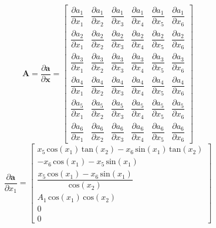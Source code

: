 \begin{equation}
	\boldsymbol A = \dfrac{\partial \boldsymbol a}{\partial  \boldsymbol x} =
	\begin{bmatrix}
\dfrac{\partial  a_1}{\partial  x_1}&
\dfrac{\partial  a_1}{\partial  x_2}&
\dfrac{\partial  a_1}{\partial  x_3}&
\dfrac{\partial  a_1}{\partial  x_4}&
\dfrac{\partial  a_1}{\partial  x_5}&
\dfrac{\partial  a_1}{\partial  x_6}
\\[1em]
\dfrac{\partial  a_2}{\partial  x_1}&
\dfrac{\partial  a_2}{\partial  x_2}&
\dfrac{\partial  a_2}{\partial  x_3}&
\dfrac{\partial  a_2}{\partial  x_4}&
\dfrac{\partial  a_2}{\partial  x_5}&
\dfrac{\partial  a_2}{\partial  x_6}
\\[1em]
\dfrac{\partial  a_3}{\partial  x_1}&
\dfrac{\partial  a_3}{\partial  x_2}&
\dfrac{\partial  a_3}{\partial  x_3}&
\dfrac{\partial  a_3}{\partial  x_4}&
\dfrac{\partial  a_3}{\partial  x_5}&
\dfrac{\partial  a_3}{\partial  x_6}
\\[1em]
\dfrac{\partial  a_4}{\partial  x_1}&
\dfrac{\partial  a_4}{\partial  x_2}&
\dfrac{\partial  a_4}{\partial  x_3}&
\dfrac{\partial  a_4}{\partial  x_4}&
\dfrac{\partial  a_4}{\partial  x_5}&
\dfrac{\partial  a_4}{\partial  x_6}
\\[1em]
\dfrac{\partial  a_5}{\partial  x_1}&
\dfrac{\partial  a_5}{\partial  x_2}&
\dfrac{\partial  a_5}{\partial  x_3}&
\dfrac{\partial  a_5}{\partial  x_4}&
\dfrac{\partial  a_5}{\partial  x_5}&
\dfrac{\partial  a_5}{\partial  x_6}
\\[1em]
\dfrac{\partial  a_6}{\partial  x_1}&
\dfrac{\partial  a_6}{\partial  x_2}&
\dfrac{\partial  a_6}{\partial  x_3}&
\dfrac{\partial  a_6}{\partial  x_4}&
\dfrac{\partial  a_6}{\partial  x_5}&
\dfrac{\partial  a_6}{\partial  x_6}
	\end{bmatrix}
\end{equation}
\begin{equation}
	 \dfrac{\partial \boldsymbol{ a}}{\partial  x_1} = 
	 \begin{bmatrix}
	 	x_5 \,\mathrm{cos}\left(x_1 \right)\,\mathrm{tan}\left(x_2 \right)-x_6 \,\mathrm{sin}\left(x_1 \right)\,\mathrm{tan}\left(x_2 \right)\\
	 	-x_6 \,\mathrm{cos}\left(x_1 \right)-x_5 \,\mathrm{sin}\left(x_1 \right)\\[0.5em]
	 	\dfrac{x_5 \,\mathrm{cos}\left(x_1 \right)-x_6 \,\mathrm{sin}\left(x_1 \right)}{\mathrm{cos}\left(x_2 \right)}\\
	 	A_1 \,\mathrm{cos}\left(x_1 \right)\,\mathrm{cos}\left(x_2 \right)\\
	 	0\\
	 	0
	 \end{bmatrix}
\end{equation}
